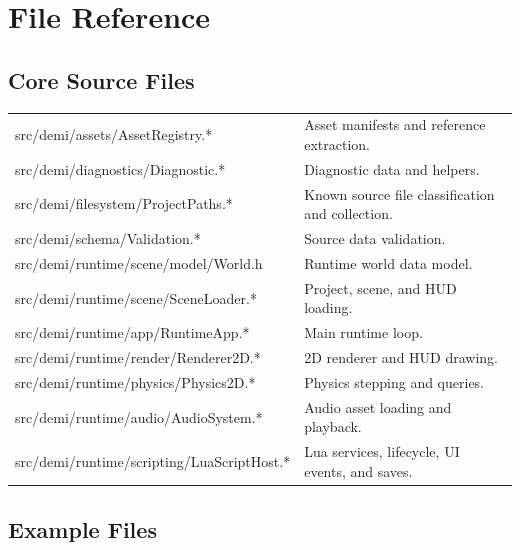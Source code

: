 \appendix
\chapter{File Reference}

\section{Core Source Files}

\begin{longtable}{>{\ttfamily\small\raggedright\arraybackslash}p{}p{}}
src/demi/assets/AssetRegistry.* & Asset manifests and reference extraction. \\
src/demi/diagnostics/Diagnostic.* & Diagnostic data and helpers. \\
src/demi/filesystem/ProjectPaths.* & Known source file classification and collection. \\
src/demi/schema/Validation.* & Source data validation. \\
src/demi/runtime/scene/model/World.h & Runtime world data model. \\
src/demi/runtime/scene/SceneLoader.* & Project, scene, and HUD loading. \\
src/demi/runtime/app/RuntimeApp.* & Main runtime loop. \\
src/demi/runtime/render/Renderer2D.* & 2D renderer and HUD drawing. \\
src/demi/runtime/physics/Physics2D.* & Physics stepping and queries. \\
src/demi/runtime/audio/AudioSystem.* & Audio asset loading and playback. \\
src/demi/runtime/scripting/LuaScriptHost.* & Lua services, lifecycle, UI events, and saves. \\
\end{longtable}

\section{Example Files}

